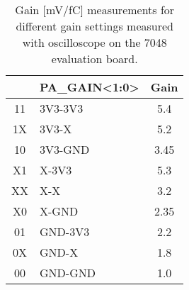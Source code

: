 \documentclass[../main/thesis.tex]{subfiles}
\begin{document}
\begin{table}[h!]	%
	\begin{center}
		\caption{Gain [mV/fC] measurements for different gain settings measured with oscilloscope on the 7048 evaluation board.}
		\label{tab-gains-7048}
		\begin{tabular}{clc}\toprule
			&\textbf{PA\_GAIN<1:0>} & \textbf{Gain}   \\ \midrule
			11&3V3-3V3 & 5.4  \\
			1X&3V3-X & 5.2  \\
			10&3V3-GND & 3.45 \\
			X1&X-3V3 & 5.3  \\
			XX&X-X & 3.2  \\
			X0&X-GND & 2.35 \\
			01&GND-3V3 & 2.2  \\
			0X&GND-X& 1.8  \\
			00&GND-GND & 1.0   \\ \bottomrule
		\end{tabular}
	\end{center}
\end{table}
\end{document}
